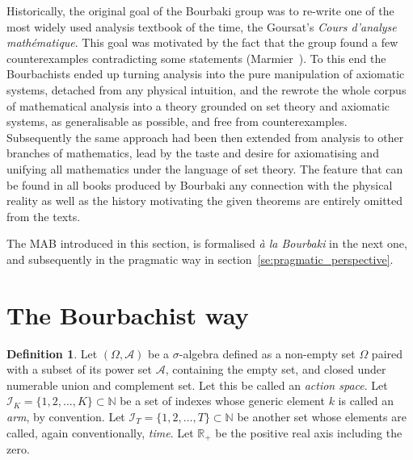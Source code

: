 \documentclass[]{scrartcl}
\theoremstyle{definition}
\newtheorem{definition}{Definition}[section]
\begin{document}
Historically, the original goal of the Bourbaki group was to re-write one of the most widely used analysis textbook of the time, the Goursat’s \emph{Cours d'analyse mathématique}. This goal was motivated by the fact that the group found a few counterexamples contradicting some statements (Marmier~\cite{marmier2014idea}). To this end the Bourbachists ended up turning analysis into the pure manipulation of axiomatic systems, detached from any physical intuition, and the rewrote the whole corpus of mathematical analysis into a theory grounded on set theory and axiomatic systems, as generalisable as possible, and free from counterexamples. Subsequently the same approach had been then extended from analysis to other branches of mathematics, lead by the taste and desire for axiomatising and unifying all mathematics under the language of set theory. The feature that can be found in all books produced by Bourbaki any connection with the physical reality as well as the history motivating the given theorems are entirely omitted from the texts.

The MAB introduced in this section, is formalised \emph{à la Bourbaki} in the next one, and subsequently in the pragmatic way in section~\ref{se:pragmatic_perspective}.


\section{The Bourbachist way}
\label{se:bourbaki_perspective}

\begin{definition}
    Let $(\Omega, \mathcal{A})$ be a $\sigma$-algebra defined as a non-empty set $\Omega$ paired with a subset of its power set $\mathcal{A}$, containing the empty set, and closed under numerable union and complement set. Let this be called an \emph{action space}. Let $\mathcal{I}_{K} = \{1,2, \dots , K\} \subset \mathbb{N}$ be a set of indexes whose generic element $k$ is called an \emph{arm}, by convention. Let $\mathcal{I}_{T} = \{1,2, \dots , T\} \subset \mathbb{N}$ be another set whose elements are called, again conventionally, \emph{time}. Let $\mathbb{R}_{+}$ be the positive real axis including the zero.
\end{definition}
\end{document}
